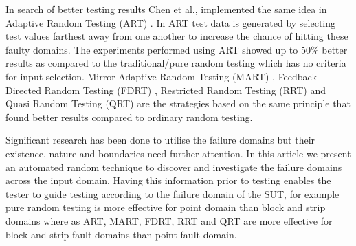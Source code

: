 \documentclass{acm_proc_article-sp}
\begin{document}
In search of better testing results Chen et al., implemented the same idea in Adaptive Random Testing (ART) \cite{Chen2008}. In ART test data is generated by selecting test values farthest away from one another to increase the chance of hitting these faulty domains. The experiments performed using ART showed up to 50\% better results as compared to the traditional/pure random testing which has no criteria for input selection. Mirror Adaptive Random Testing (MART)  \cite{Chen2003}, 
Feedback-Directed Random Testing (FDRT) \cite{Pacheco2007}, 
Restricted Random Testing (RRT) \cite{Chan2002} and Quasi Random Testing  (QRT) \cite{Chen2005} 
are the strategies based on the same principle that found better results compared to ordinary random testing.

Significant research has been done to utilise the failure domains 
but their existence, nature and boundaries need further attention. 
In this article we present an automated random technique to discover 
and investigate the failure domains across the input domain. 
Having this information prior to testing enables the tester to guide testing according 
to the failure domain of the SUT, for example pure random testing is more effective 
for point domain than block and strip domains where as ART, MART, FDRT, RRT 
and QRT are more effective for block and strip fault domains than point fault domain.

\end{document}

